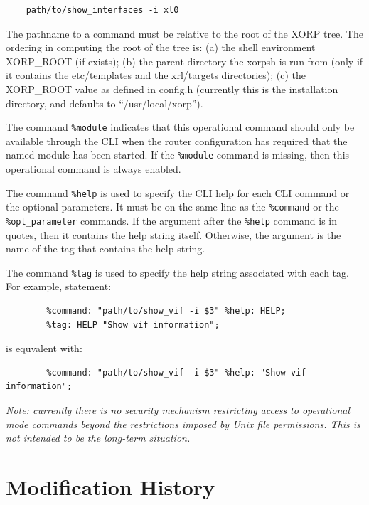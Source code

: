 \documentclass[11pt]{article}
\begin{document}
\begin{verbatim}
    path/to/show_interfaces -i xl0
\end{verbatim}

The pathname to a command must be
relative to the root of the XORP tree. The ordering in computing the root of
the tree is: (a) the shell environment XORP\_ROOT (if exists); (b) the parent
directory the xorpsh is run from (only if it contains the
etc/templates and the xrl/targets directories); (c) the XORP\_ROOT value as
defined in config.h (currently this is the installation directory, and
defaults to ``/usr/local/xorp'').

The command {\tt \%module} indicates that this operational command should
only be available through the CLI when the router configuration has required
that the named module has been started.
If the {\tt \%module} command is missing, then this operational command
is always enabled.

The command {\tt \%help} is used to specify the CLI help for each
CLI command or the optional parameters.
It must be on the same line as the {\tt \%command} or the
{\tt \%opt\_parameter} commands. If the argument after the {\tt \%help}
command is in quotes, then it contains the help string itself.
Otherwise, the argument is the name of the tag that contains the help
string.

The command {\tt \%tag} is used to specify the help string associated
with each tag. For example, statement:

\begin{verbatim}
        %command: "path/to/show_vif -i $3" %help: HELP;
        %tag: HELP "Show vif information";
\end{verbatim}

is equvalent with:

\begin{verbatim}
        %command: "path/to/show_vif -i $3" %help: "Show vif information";
\end{verbatim}

\textit{Note: currently there is no security mechanism restricting
access to operational mode commands beyond the restrictions imposed by
Unix file permissions.  This is not intended to be the long-term
situation.}

\appendix
\section{Modification History}
\end{document}
